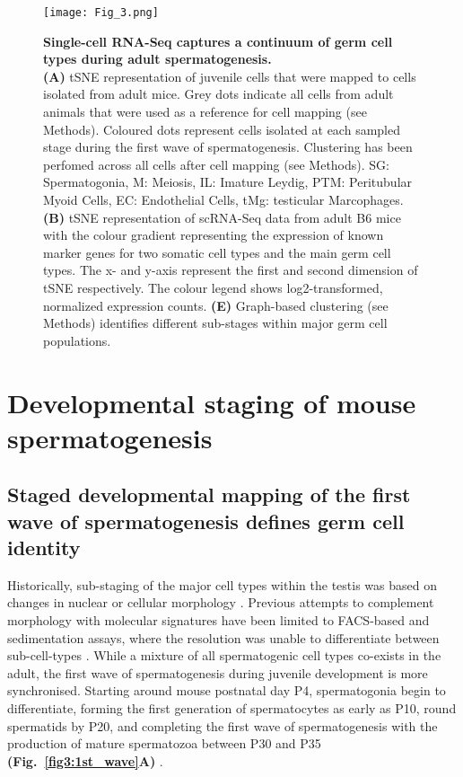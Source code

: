 \begin{figure}[!h]
\centering
\texttt{[image: Fig\_3.png]}
\caption[Droplet based scRNAseq of mouse spermatogenesis]{\textbf{Single-cell RNA-Seq captures a continuum of germ cell types during adult spermatogenesis.}\\
\textbf{(A)} tSNE representation of juvenile cells that were mapped to cells isolated from adult mice. Grey dots indicate all cells from adult animals that were used as a reference for cell mapping (see Methods). Coloured dots represent cells isolated at each sampled stage during the first wave of spermatogenesis. Clustering has been perfomed across all cells after cell mapping (see Methods). SG: Spermatogonia, M: Meiosis, IL: Imature Leydig, PTM: Peritubular Myoid Cells, EC: Endothelial Cells, tMg: testicular Marcophages. \textbf{(B)} tSNE representation of scRNA-Seq data from adult B6 mice with the colour gradient representing the expression of known marker genes for two somatic cell types and the main germ cell types. The x- and y-axis represent the first and second dimension of tSNE respectively. The colour legend shows log2-transformed, normalized expression counts. \textbf{(E)} Graph-based clustering (see Methods) identifies different sub-stages within major germ cell populations. 
}
\label{fig3:cell_types}
\end{figure}

\section{Developmental staging of mouse spermatogenesis}
\subsection*{Staged developmental mapping of the first wave of spermatogenesis defines germ cell identity}

Historically, sub-staging of the major cell types within the testis was based on changes in nuclear or cellular morphology \citep{Oakberg1956,  Oakberg1956a}. Previous attempts to complement morphology with molecular signatures have been limited to FACS-based and sedimentation assays, where the resolution was unable to differentiate between sub-cell-types \citep{Bastos2005, Gaysinskaya2014, Getun2011, Lam1970, Meistrich1977, Romrell1976, Soumillon2013}. While a mixture of all spermatogenic cell types co-exists in the adult, the first wave of spermatogenesis during juvenile development is more synchronised. Starting around mouse postnatal day P4, spermatogonia begin to differentiate, forming the first generation of spermatocytes as early as P10, round spermatids by P20, and completing the first wave of spermatogenesis with the production of mature spermatozoa between P30 and P35 \textbf{(Fig.~\ref{fig3:1st_wave}A)} \citep{Bellve1977, Janca1986, Nebel1961}.\\
 
